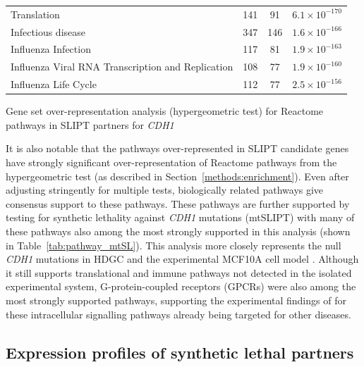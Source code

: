 \begin{table}[!ht]
{\begin{threeparttable}
\begin{tabular}{lccc}
  \rowcolor{black!5}
  Translation & 141 &  91 & $6.1 \times 10^{-170}$ \\ 
  \rowcolor{black!10}
  Infectious disease & 347 & 146 & $1.6 \times 10^{-166}$ \\ 
  \rowcolor{black!5}
  Influenza Infection & 117 &  81 & $1.9 \times 10^{-163}$ \\ 
  \rowcolor{black!10}
  Influenza Viral RNA Transcription and Replication & 108 &  77 & $1.9 \times 10^{-160}$ \\ 
  \rowcolor{black!5}
  Influenza Life Cycle & 112 &  77 & $2.5 \times 10^{-156}$ \\ 
   \hline
\end{tabular}
\begin{tablenotes}
\raggedright \small
Gene set over-representation analysis (hypergeometric test) for Reactome pathways in SLIPT partners for \textit{CDH1}
\end{tablenotes}
\end{threeparttable}
}
\end{table}

It is also notable that the pathways over-represented in SLIPT candidate genes have strongly significant over-representation of Reactome pathways from the hypergeometric test (as described in Section~\ref{methods:enrichment}). Even after adjusting stringently for multiple tests, biologically related pathways give consensus support to these pathways. These pathways are further supported by testing for synthetic lethality against \textit{CDH1} mutations (mtSLIPT) with many of these pathways also among the most strongly supported in this analysis (shown in Table~\ref{tab:pathway_mtSL}). This analysis more closely represents the null \textit{CDH1} mutations in HDGC \citep{Guilford1998} and the experimental MCF10A cell model \citep{Chen2014}. Although it still supports translational and immune pathways not detected in the isolated experimental system, G-protein-coupled receptors (GPCRs) were also among the most strongly supported pathways, supporting the experimental findings of \citet{Telford2015} for these intracellular signalling pathways already being targeted for other diseases. 


\FloatBarrier


\subsection{Expression profiles of synthetic lethal partners} \label{chapt3:exprSL_clusters}

